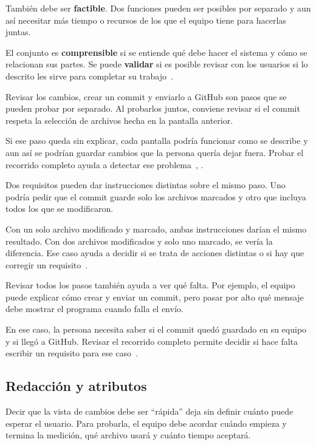 \documentclass[11pt,a4paper]{article}
\begin{document}
También debe ser \textbf{factible}. Dos funciones pueden ser posibles por
separado y aun así necesitar más tiempo o recursos de los que el equipo
tiene para hacerlas juntas.

El conjunto es \textbf{comprensible} si se entiende qué debe hacer el
sistema y cómo se relacionan sus partes. Se puede \textbf{validar} si es
posible revisar con los usuarios si lo descrito les sirve para completar su
trabajo~\cite[Sec. 5.2.6]{iso29148}.

Revisar los cambios, crear un commit y enviarlo a GitHub son pasos que se
pueden probar por separado. Al probarlos juntos, conviene revisar si el
commit respeta la selección de archivos hecha en la pantalla anterior.

Si ese paso queda sin explicar, cada pantalla podría funcionar como se
describe y aun así se podrían guardar cambios que la persona quería dejar
fuera. Probar el recorrido completo ayuda a detectar ese problema~\cite[Sec. 5.2.5]{iso29148}, \cite[Sec. 5.2.6]{iso29148}.

Dos requisitos pueden dar instrucciones distintas sobre el mismo paso. Uno
podría pedir que el commit guarde solo los archivos marcados y otro que
incluya todos los que se modificaron.

Con un solo archivo modificado y marcado, ambas instrucciones darían el
mismo resultado. Con dos archivos modificados y solo uno marcado, se vería
la diferencia. Ese caso ayuda a decidir si se trata de acciones distintas o
si hay que corregir un requisito~\cite[Sec. 5.2.6]{iso29148}.

Revisar todos los pasos también ayuda a ver qué falta. Por ejemplo, el
equipo puede explicar cómo crear y enviar un commit, pero pasar por alto qué
mensaje debe mostrar el programa cuando falla el envío.

En ese caso, la persona necesita saber si el commit quedó guardado en su
equipo y si llegó a GitHub. Revisar el recorrido completo permite decidir si
hace falta escribir un requisito para ese caso~\cite[Sec. 5.2.6]{iso29148}.

\subsection*{Redacción y atributos}

Decir que la vista de cambios debe ser ``rápida'' deja sin definir cuánto
puede esperar el usuario. Para probarla, el equipo debe acordar cuándo
empieza y termina la medición, qué archivo usará y cuánto tiempo aceptará.
\end{document}
